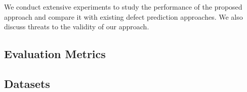We conduct extensive experiments to study the performance of the proposed approach and compare it with existing defect prediction approaches. We also discuss threats to the validity of our approach.

\subsection{Evaluation Metrics}
\label{sec:metrics}


\subsection{Datasets}
\label{sec:dataset}


%

